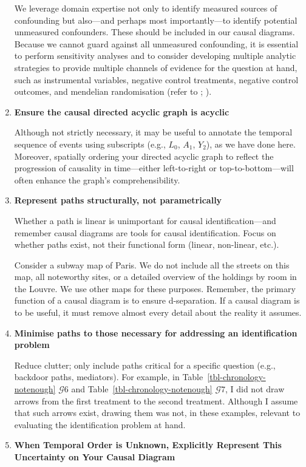 \documentclass[
  single column]{article}
\begin{document}
\begin{enumerate}
  We leverage domain expertise not only to identify measured sources of
  confounding but also---and perhaps most importantly---to identify
  potential unmeasured confounders. These should be included in our
  causal diagrams. Because we cannot guard against all unmeasured
  confounding, it is essential to perform sensitivity analyses and to
  consider developing multiple analytic strategies to provide multiple
  channels of evidence for the question at hand, such as instrumental
  variables, negative control treatments, negative control outcomes, and
  mendelian randomisation (refer to
  ;
  ).
\item
  \textbf{Ensure the causal directed acyclic graph is acyclic}

  Although not strictly necessary, it may be useful to annotate the
  temporal sequence of events using subscripts (e.g., \(L_0\), \(A_1\),
  \(Y_2\)), as we have done here. Moreover, spatially ordering your
  directed acyclic graph to reflect the progression of causality in
  time---either left-to-right or top-to-bottom---will often enhance the
  graph's comprehensibility.
\item
  \textbf{Represent paths structurally, not parametrically}

  Whether a path is linear is unimportant for causal
  identification---and remember causal diagrams are tools for causal
  identification. Focus on whether paths exist, not their functional
  form (linear, non-linear, etc.).

  Consider a subway map of Paris. We do not include all the streets on
  this map, all noteworthy sites, or a detailed overview of the holdings
  by room in the Louvre. We use other maps for these purposes. Remember,
  the primary function of a causal diagram is to ensure d-separation. If
  a causal diagram is to be useful, it must remove almost every detail
  about the reality it assumes.
\item
  \textbf{Minimise paths to those necessary for addressing an
  identification problem}

  Reduce clutter; only include paths critical for a specific question
  (e.g., backdoor paths, mediators). For example, in
  Table~\ref{tbl-chronology-notenough} \(\mathcal{G} 6\) and
  Table~\ref{tbl-chronology-notenough} \(\mathcal{G} 7\), I did not draw
  arrows from the first treatment to the second treatment. Although I
  assume that such arrows exist, drawing them was not, in these
  examples, relevant to evaluating the identification problem at hand.
\item
  \textbf{When Temporal Order is Unknown, Explicitly Represent This
  Uncertainty on Your Causal Diagram}


\end{enumerate}
\end{document}
